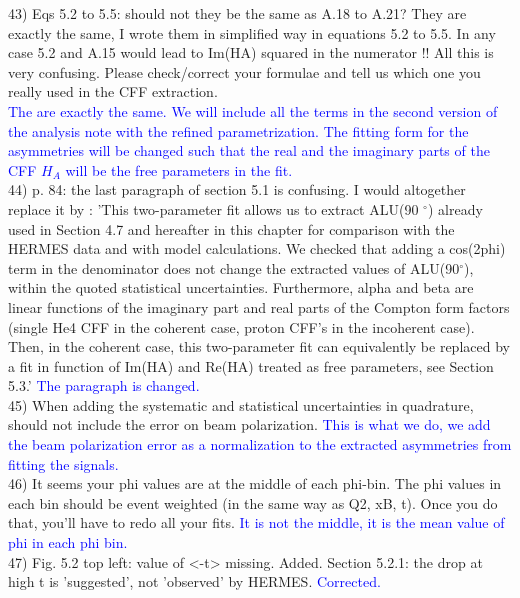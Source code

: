 43) Eqs 5.2 to 5.5: should not they be the same as A.18 to A.21? 
    They are exactly the same, I wrote them in simplified way in equations 5.2 to 5.5. 
In any case 5.2 and A.15 would lead to Im(HA) squared in the numerator !! All this is very 
confusing. Please check/correct your formulae and tell us which one you really 
used in the CFF extraction.\\
\textcolor{blue}{ The are exactly the same. We will include all the terms in 
the second version of the analysis note with the refined parametrization. The 
fitting form for the asymmetries will be changed such that the real and the 
imaginary parts of the CFF $H_A$ will be the free parameters in the fit.} \\

44) p. 84: the last paragraph of section 5.1 is confusing. I would altogether 
replace it by :
'This two-parameter fit allows us to extract ALU(90 $^{\circ}$) already used in 
Section 4.7 and hereafter in this chapter for comparison with the HERMES data 
and with model calculations. We checked that adding a cos(2phi) term in the 
denominator does not change the extracted values of ALU(90$^{\circ}$), within 
the quoted statistical uncertainties. Furthermore, alpha and beta are linear 
functions of the imaginary part and real parts of the Compton form factors 
(single He4 CFF in the coherent case, proton CFF's in the incoherent case).  
Then, in the coherent case, this two-parameter fit can equivalently be replaced 
by a fit in function of Im(HA) and Re(HA) treated as free parameters, see 
Section 5.3.'
\textcolor{blue}{ The paragraph is changed.}\\

45) When adding the systematic and statistical uncertainties in quadrature, should 
not include the error on beam polarization.
\textcolor{blue}{This is what we do, we add the beam polarization error as a 
normalization to the extracted asymmetries from fitting the signals.}\\

46) It seems your phi values are at the middle of each phi-bin. The phi values in 
each bin should be event weighted (in the same way as Q2, xB, t). Once you do 
that, you'll have to redo all your fits.
\textcolor{blue}{ It is not the middle, it is the mean value of phi in each phi 
bin.}\\

47) Fig. 5.2 top left: value of <-t> missing. Added.  Section 5.2.1: the drop 
at high t is 'suggested', not 'observed' by HERMES. \textcolor{blue}{ 
Corrected.}\\

